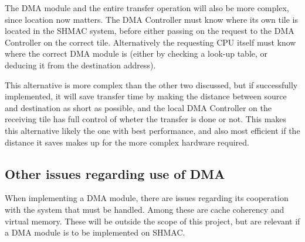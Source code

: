 The DMA module and the entire transfer operation will also be more complex, since location now matters.
The DMA Controller must know where its own tile is located in the SHMAC system, before either passing on the request to the DMA Controller on the correct tile.
Alternatively the requesting CPU itself must know where the correct DMA module is (either by checking a look-up table, or deducing it from the destination address).

This alternative is more complex than the other two discussed, but if successfully implemented, it will save transfer time by making the distance between source and destination as short as possible, and the local DMA Controller on the receiving tile has full control of wheter the transfer is done or not.
This makes this alternative likely the one with best performance, and also most efficient if the distance it saves makes up for the more complex hardware required.


\subsection{Other issues regarding use of DMA}

When implementing a DMA module, there are issues regarding its cooperation with the system that must be handled.
Among these are cache coherency and virtual memory.
These will be outside the scope of this project, but are relevant if a DMA module is to be implemented on SHMAC.


